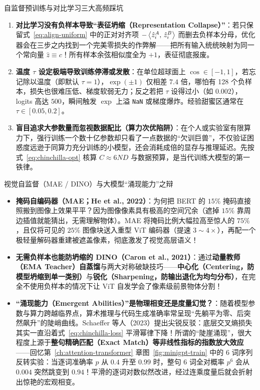 \begin{failBox}{自监督预训练与对比学习三大高频踩坑}
\begin{enumerate}
  \item \textbf{对比学习没有负样本导致“表征坍缩（Representation Collapse）”}：若只保留式~\eqref{eq:align-uniform} 中的正对对齐项 $-\left\langle \hat{z}_i^A,\, \hat{z}_i^B \right\rangle$ 而删去负样本分母，优化器会在三步之内找到一个完美零损失的作弊解——把所有输入统统映射为同一个常向量 $\hat{z} \equiv c$！所有样本余弦相似度全为 $+1$，表征彻底报废。
  \item \textbf{温度 $\tau$ 设定极端导致训练停滞或发散}：在单位超球面上 $\cos \in [-1, 1]$，若忘记除以温度（即默认 $\tau = 1$），$\exp(\pm 1)$ 仅相差 $7.4$ 倍，哪怕有 128 个负样本，损失也很难压低、梯度软弱无力；反之若把 $\tau$ 设得过小（如 $0.002$），logits 高达 $500$，瞬间触发 $\exp$ 上溢 \texttt{NaN} 或梯度爆炸。经验甜蜜区通常在 $\tau \in [0.05, 0.2]$。
  \item \textbf{盲目追求大参数量而忽视数据配比（算力次优陷阱）}：在个人或实验室有限算力下，强行训练一个数十亿参数却只看了一点数据的“欠训巨兽”，不仅验证困惑度远逊于同算力充分训练的小模型，还会消耗成倍的显存与推理延迟。先按式~\eqref{eq:chinchilla-opt} 核算 $C \approx 6ND$ 与数据预算，是当代训练大模型的第一铁律。
\end{enumerate}
\end{failBox}

\begin{extBox}{视觉自监督（MAE / DINO）与大模型“涌现能力”之辩}
\begin{itemize}
  \item \textbf{掩码自编码器（MAE；He et al., 2022）}：为何把 BERT 的 $15\%$ 掩码直接照搬到图像上效果平平？因为图像像素具有极高的空间冗余（遮掉 $15\%$ 靠周边插值就能猜出，无需理解物体）。MAE 将掩码比例大幅拉高至惊人的 \textbf{$75\%$}，且仅将可见的 $25\%$ 图像块送入重型 ViT 编码器（提速 $3\sim 4\times$），再配一个极轻量解码器重建被遮盖像素，彻底激发了视觉高层语义！
  \item \textbf{无需负样本也能防坍缩的 DINO（Caron et al., 2021）}：通过\textbf{动量教师（EMA Teacher）自蒸馏}与两大对称破缺技巧——\textbf{中心化（Centering，防模型坍缩到单一类别）}与\textbf{锐化（Sharpening，防输出退化为均匀分布）}，在完全不使用负样本的情况下让 ViT 自发学会了像素级前景物体分割！
  \item \textbf{“涌现能力（Emergent Abilities）”是物理相变还是度量幻觉？}：随着模型参数与算力跨越临界点，算术推理与代码生成准确率常呈现“先躺平为零、后突然飙升”的陡峭曲线。Schaeffer 等人（2023）提出尖锐反驳：底层交叉熵损失其实一直沿着式~\eqref{eq:chinchilla-loss} 平滑幂律下降！所谓的“陡崖涌现”，很大程度上源于\textbf{整句精确匹配（Exact Match）等非线性指标的指数放大效应}——回忆第~\ref{ch:attention-transformer} 章图~\ref{fig:minigpt-train} 中的 6 词序列反转实验：当逐词准确率 $p$ 从 $0.4$ 升至 $0.99$ 时，整句 6 词全对概率 $p^6$ 会从 $0.004$ 突然跳变到 $0.94$！平滑的逐词对数似然改进，经过连乘度量后就会折射出惊艳的宏观相变。
\end{itemize}
\end{extBox}

